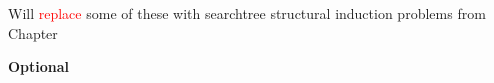 \documentclass[handout]{mcs}
\begin{document}

\begin{staffnotes}
Will \textcolor{red}{replace} some of these with searchtree structural
induction problems from
Chapter~
\end{staffnotes}



%



\begin{center}
\textbf{Optional}
\end{center}






\end{document}
